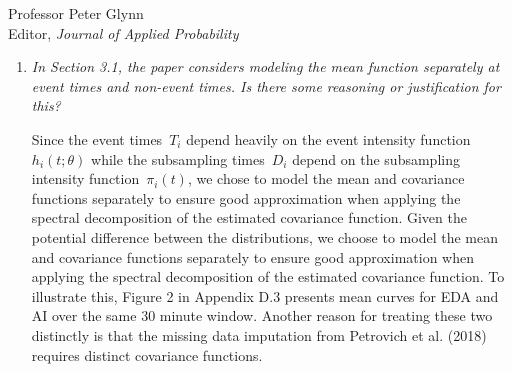 \documentclass[11pt]{letter} %
\begin{document}
\begin{letter}{Professor
	Peter Glynn\\
	Editor, {\em Journal of Applied Probability}}
\begin{enumerate}
\vspace{5mm}
We have decided that the point we were trying to raise is not essential to the main manuscript, so we have moved the discussion of \emph{independent evolution} and its implication that $\varepsilon (t) = 0$ for all $t >0$ to the Appendix.  The key issue we were trying to clarify is that the traditional joint model formulation in which the observed health process and time-to-event are conditionally independent given the latent process implies that the hazard function conditional on the entire observed health process depends on values after the current time.  In the case study, for example, this implies that the expected risk of a button press given the entire sensor process will depend on future activity index and electrodermal activity.  This holds unless we assume the measurement error is set to zero.  The referee is correct that we will only compute conditional probabilities given the historical functional predictor; however, the likelihood factorization means that we implicitly are defining a conditional intensity given the entire functional predictor and the traditional approach has this undesirable dependence. While the author still thinks it an important point that he wishes was more well appreciated in the joint modeling literature, the current paper has enough content for this discussion to be omitted from the main manuscript.  Moreover, the empirical impact seems to be limited and therefore it is better to make this point in the Appendix.
\vspace{5mm}


\item {\it In Section 3.1, the paper considers modeling the mean function separately at event times and non-event times. Is there some reasoning or justification for this?}

\vspace{5mm}
Since the event times~$T_i$ depend heavily on the event intensity function~$h_i (t;\theta)$ while the subsampling times~$D_i$ depend on the subsampling intensity function~$\pi_i(t)$, we chose to model the mean and covariance functions separately to ensure good approximation when applying the spectral decomposition of the estimated covariance function.  Given the potential difference between the distributions, we choose to model the mean and covariance functions separately to ensure good approximation when applying the spectral decomposition of the estimated covariance function.  To illustrate this, Figure 2 in Appendix D.3 presents mean curves for EDA and AI over the same 30 minute window. Another reason for treating these two distinctly is that the missing data imputation from Petrovich et al. (2018) requires distinct covariance functions.
\vspace{5mm}


\end{enumerate}
\end{letter}
\end{document}
